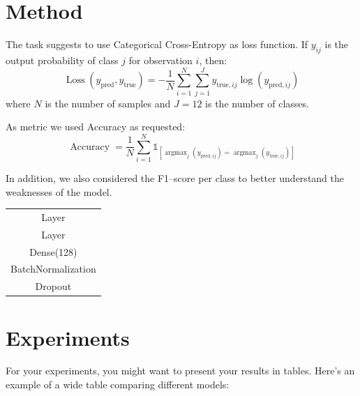 \documentclass[11pt]{article}
\begin{document}
\begin{multicols*}{2}
        \section{Method}

        The task suggests to use Categorical Cross-Entropy as loss function. If $y_{ij}$ is the output probability of class $j$ for observation $i$, then:
        \begin{equation*}
        \label{eq:loss}
        \operatorname{Loss}(y_{\text{pred}},y_{\text{true}}) = - \frac{1}{N} \sum_{i=1}^N \sum_{j=1}^J y_{\text{true},ij} \log(y_{\text{pred},ij})
        \end{equation*}
        where $N$ is the number of samples and $J = 12$ is the number of classes.

        As metric we used Accuracy as requested:
        \begin{equation*}
        \label{eq:accuracy}
        \operatorname{Accuracy} = \frac{1}{N} \sum_{i=1}^N \mathds{1}_{[\operatorname{argmax}_j (y_{\text{pred},ij}) = \operatorname{argmax}_j (y_{\text{true},ij})]}
        \end{equation*}

        In addition, we also considered the F1--score per class to better understand the weaknesses of the model.

        \begin{center}
        \begin{tabular}{c}
        \hline
        Layer\\
        Layer\\
        Dense(128)\\
        BatchNormalization\\
        Dropout\\
        \hline
        \end{tabular}
        \end{center}

        \section{Experiments}
        For your experiments, you might want to present your results in tables. Here's an example of a wide table comparing different models:


\end{multicols*}
\end{document}
